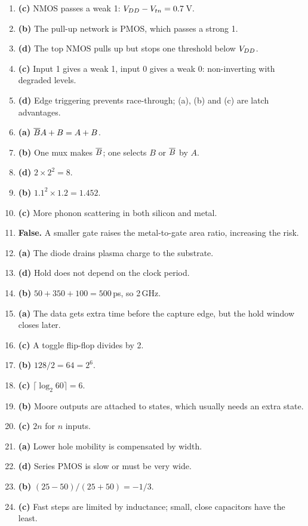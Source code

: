 \begin{enumerate}
  \item \textbf{(c)} NMOS passes a weak 1: $V_{DD} - V_{tn} = 0.7$\,V.
  \item \textbf{(b)} The pull-up network is PMOS, which passes a strong 1.
  \item \textbf{(d)} The top NMOS pulls up but stops one threshold below $V_{DD}$.
  \item \textbf{(c)} Input 1 gives a weak 1, input 0 gives a weak 0: non-inverting with degraded levels.
  \item \textbf{(d)} Edge triggering prevents race-through; (a), (b) and (c) are latch advantages.
  \item \textbf{(a)} $\overline{B}A + B = A + B$.
  \item \textbf{(b)} One mux makes $\overline{B}$; one selects $B$ or $\overline{B}$ by $A$.
  \item \textbf{(d)} $2 \times 2^2 = 8$.
  \item \textbf{(b)} $1.1^2 \times 1.2 = 1.452$.
  \item \textbf{(c)} More phonon scattering in both silicon and metal.
  \item \textbf{False.} A smaller gate raises the metal-to-gate area ratio, increasing the risk.
  \item \textbf{(a)} The diode drains plasma charge to the substrate.
  \item \textbf{(d)} Hold does not depend on the clock period.
  \item \textbf{(b)} $50 + 350 + 100 = 500$\,ps, so 2\,GHz.
  \item \textbf{(a)} The data gets extra time before the capture edge, but the hold window closes later.
  \item \textbf{(c)} A toggle flip-flop divides by 2.
  \item \textbf{(b)} $128/2 = 64 = 2^6$.
  \item \textbf{(c)} $\lceil\log_2 60\rceil = 6$.
  \item \textbf{(b)} Moore outputs are attached to states, which usually needs an extra state.
  \item \textbf{(c)} $2n$ for $n$ inputs.
  \item \textbf{(a)} Lower hole mobility is compensated by width.
  \item \textbf{(d)} Series PMOS is slow or must be very wide.
  \item \textbf{(b)} $(25-50)/(25+50) = -1/3$.
  \item \textbf{(c)} Fast steps are limited by inductance; small, close capacitors have the least.

\end{enumerate}
